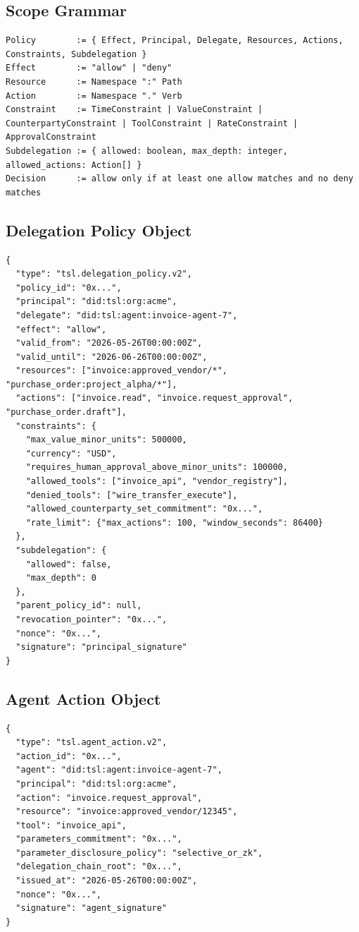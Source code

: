 \documentclass[11pt]{article}
\begin{document}
\subsection{Scope Grammar}

\begin{lstlisting}[style=tslcode]
Policy        := { Effect, Principal, Delegate, Resources, Actions, Constraints, Subdelegation }
Effect        := "allow" | "deny"
Resource      := Namespace ":" Path
Action        := Namespace "." Verb
Constraint    := TimeConstraint | ValueConstraint | CounterpartyConstraint | ToolConstraint | RateConstraint | ApprovalConstraint
Subdelegation := { allowed: boolean, max_depth: integer, allowed_actions: Action[] }
Decision      := allow only if at least one allow matches and no deny matches
\end{lstlisting}

\subsection{Delegation Policy Object}

\begin{lstlisting}[style=tslcode]
{
  "type": "tsl.delegation_policy.v2",
  "policy_id": "0x...",
  "principal": "did:tsl:org:acme",
  "delegate": "did:tsl:agent:invoice-agent-7",
  "effect": "allow",
  "valid_from": "2026-05-26T00:00:00Z",
  "valid_until": "2026-06-26T00:00:00Z",
  "resources": ["invoice:approved_vendor/*", "purchase_order:project_alpha/*"],
  "actions": ["invoice.read", "invoice.request_approval", "purchase_order.draft"],
  "constraints": {
    "max_value_minor_units": 500000,
    "currency": "USD",
    "requires_human_approval_above_minor_units": 100000,
    "allowed_tools": ["invoice_api", "vendor_registry"],
    "denied_tools": ["wire_transfer_execute"],
    "allowed_counterparty_set_commitment": "0x...",
    "rate_limit": {"max_actions": 100, "window_seconds": 86400}
  },
  "subdelegation": {
    "allowed": false,
    "max_depth": 0
  },
  "parent_policy_id": null,
  "revocation_pointer": "0x...",
  "nonce": "0x...",
  "signature": "principal_signature"
}
\end{lstlisting}

\subsection{Agent Action Object}

\begin{lstlisting}[style=tslcode]
{
  "type": "tsl.agent_action.v2",
  "action_id": "0x...",
  "agent": "did:tsl:agent:invoice-agent-7",
  "principal": "did:tsl:org:acme",
  "action": "invoice.request_approval",
  "resource": "invoice:approved_vendor/12345",
  "tool": "invoice_api",
  "parameters_commitment": "0x...",
  "parameter_disclosure_policy": "selective_or_zk",
  "delegation_chain_root": "0x...",
  "issued_at": "2026-05-26T00:00:00Z",
  "nonce": "0x...",
  "signature": "agent_signature"
}
\end{lstlisting}
\end{document}
